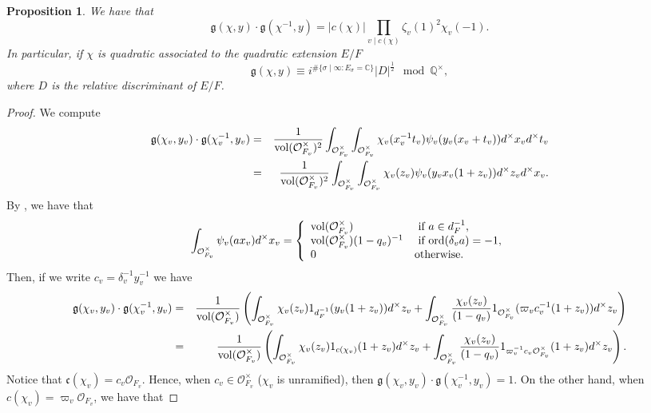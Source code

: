 \documentclass{amsart}
\newtheorem{proposition}[theorem]{Proposition}
\theoremstyle{definition}
\theoremstyle{remark}
\numberwithin{equation}{section}
\newcommand{\Q}{{\mathbb Q}}
\newcommand{\C}{{\mathbb C}}
\newcommand{\cO}{{\mathcal O}}
\begin{document}
\begin{proposition}\label{propertiesGaussS}
    We have that 
    \[
    \mathfrak{g}(\chi,y)\cdot \mathfrak{g}(\chi^{-1},y)=|c(\chi)|\prod_{v\mid c(\chi)}\zeta_v(1)^{2}\chi_v(-1).
    \]
	In particular, if $\chi$ is quadratic associated to the quadratic extension $E/F$
    \[
	  \mathfrak{g}(\chi,y)\equiv i^{\#\{\sigma\mid\infty\colon E_\sigma=\C\}} |D|^{\frac{1}{2}}\mod\Q^\times,	
    \]
where $D$ is the relative discriminant of $E/F$.
\end{proposition}
\begin{proof}

    We compute 
    \begin{eqnarray*}
    \mathfrak{g}(\chi_v,y_v)\cdot \mathfrak{g}(\chi_v^{-1},y_v)&=&\frac{1}{{\rm vol}(\cO_{F_v}^\times)^2}\int_{\cO_{F_v}^\times}\int_{\cO_{F_v}^\times}\chi_v(x_v^{-1}t_v)\psi_v(y_v(x_v+t_v))d^\times x_v d^\times t_v\\
    &=&\frac{1}{{\rm vol}(\cO_{F_v}^\times)^2}\int_{\cO_{F_v}^\times}\int_{\cO_{F_v}^\times}\chi_v(z_v)\psi_v(y_vx_v(1+z_v))d^\times z_v d^\times x_v.
    \end{eqnarray*}
    By \cite[Lemma 2.1]{Spiess}, we have that
    \[
    \int_{\cO_{F_v}^\times}\psi_v(ax_v)d^\times x_v=\left\{\begin{array}{ll}
         {\rm vol}(\cO_{F_v}^\times)& \text{ if } a\in d_F^{-1}, \\
         {\rm vol}(\cO_{F_v}^\times)(1-q_v)^{-1}& \text{ if } {\rm ord}(\delta_va)=-1 ,\\
         0&\mbox{otherwise}.
    \end{array}\right.
    \]
    Then, if we write $c_v=\delta_v^{-1}y_v^{-1}$ we have
    \begin{eqnarray*}
    \mathfrak{g}(\chi_v,y_v)\cdot \mathfrak{g}(\chi_v^{-1},y_v)&=&\frac{1}{{\rm vol}(\cO_{F_v}^\times)}\left(\int_{\cO_{F_v}^\times}\chi_v(z_v)1_{d_F^{-1}}(y_v(1+z_v))d^\times z_v+ \int_{\cO_{F_v}^\times}\frac{\chi_v(z_v)}{(1-q_v)}1_{\cO_{F_v}^\times}(\varpi_vc_v^{-1}(1+z_v))d^\times z_v\right)\\
    &=&\frac{1}{{\rm vol}(\cO_{F_v}^\times)}\left(\int_{\cO_{F_v}^\times}\chi_v(z_v)1_{c(\chi_v)}(1+z_v)d^\times z_v+ \int_{\cO_{F_v}^\times}\frac{\chi_v(z_v)}{(1-q_v)}1_{\varpi_v^{-1}c_v\cO_{F_v}^\times}(1+z_v)d^\times z_v\right).
    \end{eqnarray*}
   Notice that $\mathfrak{c}(\chi_v)=c_v\cO_{F_v}$. Hence, when $c_v\in\cO_{F_v}^\times$ ($\chi_v$ is unramified), then  $\mathfrak{g}(\chi_v,y_v)\cdot \mathfrak{g}(\chi_v^{-1},y_v)=1$. On the other hand, when $c(\chi_v)= \varpi_v\cO_{F_v}$, we have that

\end{proof}
\end{document}
